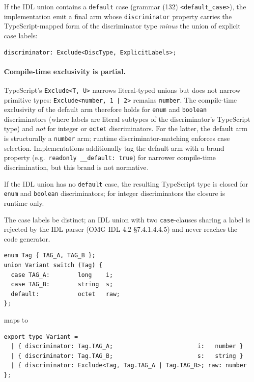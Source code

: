 \documentclass{../styles/zerodds-vendor-spec}
\begin{document}
If the IDL union contains a \texttt{default} case (grammar (132)
\texttt{<default\_case>}), the implementation  emit
a final arm whose \texttt{discriminator} property carries the
TypeScript-mapped form of the discriminator type \emph{minus}
the union of explicit case labels:

\begin{lstlisting}
discriminator: Exclude<DiscType, ExplicitLabels>;
\end{lstlisting}

\paragraph{Compile-time exclusivity is partial.} TypeScript's
\texttt{Exclude<T, U>} narrows literal-typed unions but does
not narrow primitive types: \texttt{Exclude<number, 1\,|\,2>}
remains \texttt{number}. The compile-time exclusivity of the
default arm therefore holds for \texttt{enum} and
\texttt{boolean} discriminators (where labels are literal
subtypes of the discriminator's TypeScript type) and \emph{not}
for integer or \texttt{octet} discriminators. For the latter,
the default arm is structurally a \texttt{number} arm; runtime
discriminator-matching enforces case selection. Implementations
 additionally tag the default arm with a brand
property (e.g.\ \texttt{readonly \_\_default:\,true}) for
narrower compile-time discrimination, but this brand is not
normative.

If the IDL union has no \texttt{default} case, the resulting
TypeScript type is closed for \texttt{enum} and \texttt{boolean}
discriminators; for integer discriminators the closure is
runtime-only.

The case labels  be distinct; an IDL union with two
\texttt{case}-clauses sharing a label is rejected by the IDL
parser (OMG IDL 4.2 §7.4.1.4.4.5) and never reaches the code
generator.

\begin{specexample}
\begin{lstlisting}
enum Tag { TAG_A, TAG_B };
union Variant switch (Tag) {
  case TAG_A:        long    i;
  case TAG_B:        string  s;
  default:           octet   raw;
};
\end{lstlisting}
maps to
\begin{lstlisting}
export type Variant =
  | { discriminator: Tag.TAG_A;                        i:   number }
  | { discriminator: Tag.TAG_B;                        s:   string }
  | { discriminator: Exclude<Tag, Tag.TAG_A | Tag.TAG_B>; raw: number };
\end{lstlisting}
\end{specexample}
\end{document}
